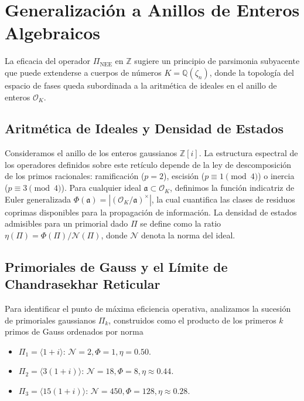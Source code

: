 \documentclass[sn-mathphys]{sn-jnl}
\theoremstyle{definition} %
\begin{document}
\section{Generalización a Anillos de Enteros Algebraicos}

La eficacia del operador $\Pi_{\text{NEE}}$ en $\mathbb{Z}$ sugiere un principio de parsimonia subyacente que puede extenderse a cuerpos de números $K = \mathbb{Q}(\zeta_n)$, donde la topología del espacio de fases queda subordinada a la aritmética de ideales en el anillo de enteros $\mathcal{O}_K$.

\subsection{Aritmética de Ideales y Densidad de Estados}
Consideramos el anillo de los enteros gaussianos $\mathbb{Z}[i]$. La estructura espectral de los operadores definidos sobre este retículo depende de la ley de descomposición de los primos racionales: ramificación ($p=2$), escisión ($p \equiv 1 \pmod 4$) o inercia ($p \equiv 3 \pmod 4$). Para cualquier ideal $\mathfrak{a} \subset \mathcal{O}_K$, definimos la función indicatriz de Euler generalizada $\Phi(\mathfrak{a}) = |(\mathcal{O}_K/\mathfrak{a})^\times|$, la cual cuantifica las clases de residuos coprimas disponibles para la propagación de información. La densidad de estados admisibles para un primorial dado $\Pi$ se define como la ratio $\eta(\Pi) = \Phi(\Pi)/\mathcal{N}(\Pi)$, donde $\mathcal{N}$ denota la norma del ideal.

\subsection{Primoriales de Gauss y el Límite de Chandrasekhar Reticular}
Para identificar el punto de máxima eficiencia operativa, analizamos la sucesión de primoriales gaussianos $\Pi_k$, construidos como el producto de los primeros $k$ primos de Gauss ordenados por norma
\begin{itemize}
    \item $\Pi_1 = \langle 1+i \rangle$: $\mathcal{N}=2, \Phi=1, \eta=0.50$.
    \item $\Pi_2 = \langle 3(1+i) \rangle$: $\mathcal{N}=18, \Phi=8, \eta \approx 0.44$.
    \item $\Pi_3 = \langle 15(1+i) \rangle$: $\mathcal{N}=450, \Phi=128, \eta \approx 0.28$.
\end{itemize}
\end{document}
